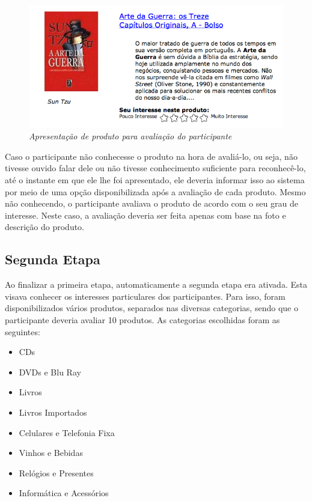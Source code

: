 \begin{figure}[htp]
  \centering
  \includegraphics[width=\textwidth]{imagens/product-rating}
  \caption{\it Apresentação de produto para avaliação do participante}
  \label{fig:product-rating}
\end{figure}

Caso o participante não conhecesse o produto na hora de avaliá-lo, ou seja, não tivesse ouvido falar dele ou não tivesse conhecimento suficiente para reconhecê-lo, até o instante em que ele lhe foi apresentado, ele deveria informar isso ao sistema por meio de uma opção disponibilizada após a avaliação de cada produto. Mesmo não conhecendo, o participante avaliava o produto de acordo com o seu grau de interesse. Neste caso, a avaliação deveria ser feita apenas com base na foto e descrição do produto.

\subsection{Segunda Etapa}
\label{cha:segunda_etapa}

Ao finalizar a primeira etapa, automaticamente a segunda etapa era ativada. Esta visava conhecer os interesses particulares dos participantes. Para isso, foram disponibilizados vários produtos, separados nas diversas categorias, sendo que o participante deveria avaliar 10 produtos. As categorias escolhidas foram as seguintes:

\begin{itemize}
  \item CDs
  \item DVDs e Blu Ray
  \item Livros
  \item Livros Importados
  \item Celulares e Telefonia Fixa
  \item Vinhos e Bebidas
  \item Relógios e Presentes
  \item Informática e Acessórios
\end{itemize}

